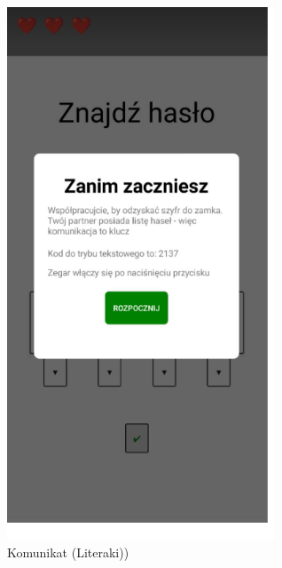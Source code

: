 	\begin{figure}[!htb]
	\begin{center}
		\includegraphics[width=8cm]{rys/opis8.png}
		\caption{Komunikat (Literaki))}
		\label{rys:rysunek001}
	\end{center}
\end{figure}

